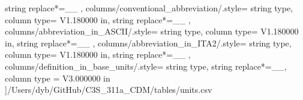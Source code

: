 \begin{landscape}
{            string replace*={_}{\_}
        },
    columns/conventional_abbreviation/.style={
            string type, 
            column type= V{1.180000 in}, 
            string replace*={_}{\_}
        },
    columns/abbreviation_in_ASCII/.style={
            string type, 
            column type= V{1.180000 in}, 
            string replace*={_}{\_}
        },
    columns/abbreviation_in_ITA2/.style={
            string type, 
            column type= V{1.180000 in}, 
            string replace*={_}{\_}
        },
    columns/definition_in_base_units/.style={
            string type, 
            string replace*={_}{\_},
            column type = V{3.000000 in}
        }
    ]{/Users/dyb/GitHub/C3S_311a_CDM/tables/units.csv}
\end{landscape}
